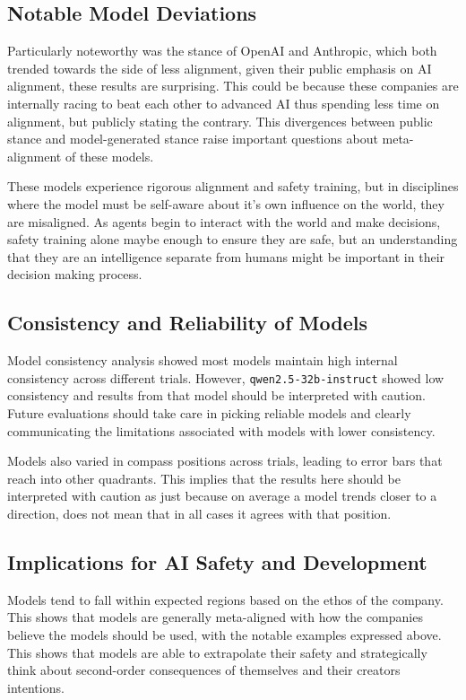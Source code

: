 \subsection{Notable Model Deviations}

Particularly noteworthy was the stance of OpenAI and Anthropic, which both trended towards the side of less alignment, given their public emphasis on AI alignment, these results are surprising. This could be because these companies are internally racing to beat each other to advanced AI thus spending less time on alignment, but publicly stating the contrary. This divergences between public stance and model-generated stance raise important questions about meta-alignment of these models. 

These models experience rigorous alignment and safety training, but in disciplines where the model must be self-aware about it's own influence on the world, they are misaligned. As agents begin to interact with the world and make decisions, safety training alone maybe enough to ensure they are safe, but an understanding that they are an intelligence separate from humans might be important in their decision making process.

\subsection{Consistency and Reliability of Models}

Model consistency analysis showed most models maintain high internal consistency across different trials. However, \texttt{qwen2.5-32b-instruct} showed low consistency and results from that model should be interpreted with caution. Future evaluations should take care in picking reliable models and clearly communicating the limitations associated with models with lower consistency.

Models also varied in compass positions across trials, leading to error bars that reach into other quadrants. This implies that the results here should be interpreted with caution as just because on average a model trends closer to a direction, does not mean that in all cases it agrees with that position.

\subsection{Implications for AI Safety and Development}

Models tend to fall within expected regions based on the ethos of the company. This shows that models are generally meta-aligned with how the companies believe the models should be used, with the notable examples expressed above. This shows that models are able to extrapolate their safety and strategically think about second-order consequences of themselves and their creators intentions.

